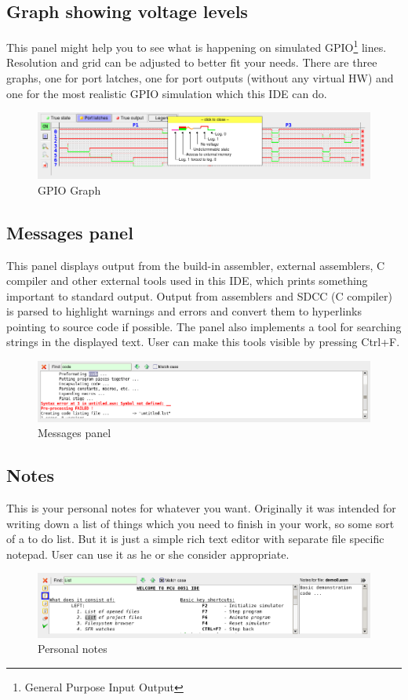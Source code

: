 \documentclass[a4paper,twoside,12pt]{book}
\begin{document}
		\subsection{Graph showing voltage levels}
			This panel might help you to see what is happening on simulated GPIO\footnote{General Purpose Input Output} lines. Resolution and grid can be adjusted to better fit your needs. There are three graphs, one for port latches, one for port outputs (without any virtual HW) and one for the most realistic GPIO simulation which this IDE can do.
			\begin{figure}[h!]
				\centering{}
				\includegraphics[width=\textwidth]{img/005.png}
				\caption{GPIO Graph}
			\end{figure}

		\subsection{Messages panel}
			This panel displays output from the build-in assembler, external assemblers, C compiler and other external tools used in this IDE, which prints something important to standard output. Output from assemblers and SDCC (C compiler) is parsed to highlight warnings and errors and convert them to hyperlinks pointing to source code if possible. The panel also implements a tool for searching strings in the displayed text. User can make this tools visible by pressing Ctrl+F.
			\begin{figure}[h!]
				\centering{}
				\includegraphics[width=\textwidth]{img/007.png}
				\caption{Messages panel}
			\end{figure}

		\subsection{Notes}
			This is your personal notes for whatever you want. Originally it was intended for writing down a list of things which you need to finish in your work, so some sort of a to do list. But it is just a simple rich text editor with separate file specific notepad. User can use it as he or she consider appropriate.
			\begin{figure}[h!]
				\centering{}
				\includegraphics[width=\textwidth]{img/006.png}
				\caption{Personal notes}
			\end{figure}
\end{document}
